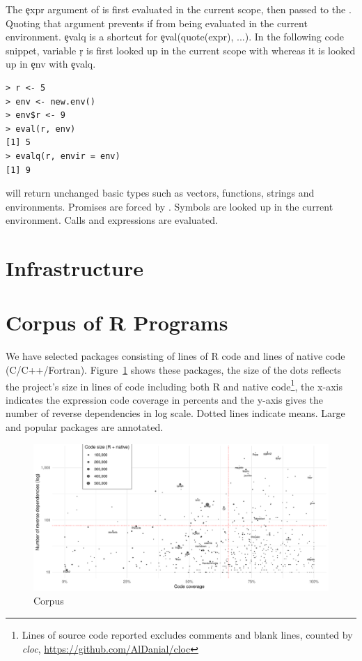 \documentclass[conference]{IEEEtran}
\begin{document}
The \c{expr} argument of \eval is first evaluated in the current scope, then passed to the \eval. Quoting that argument prevents if from being evaluated in the current environment. \c{evalq} is a shortcut for \c{eval(quote(expr), ...)}. In the following code snippet, variable \c{r} is first looked up in the current scope with \eval whereas it is looked up in \c{env} with \c{evalq}.

\begin{lstlisting}
> r <- 5
> env <- new.env()
> env$r <- 9
> eval(r, env)
[1] 5
> evalq(r, envir = env)
[1] 9
\end{lstlisting}

\eval will return unchanged basic types such as vectors, functions, strings and environments. Promises are forced by \eval. Symbols are looked up in the current environment. Calls and expressions are evaluated. 

\section{Infrastructure}


\section{Corpus of R Programs}

We have selected \CorpusPackages packages consisting of \CorpusRCodeRnd
lines of R code and \CorpusNativeCodeRnd lines of native code
(C/C++/Fortran).  Figure~\ref{fig:corpus} shows these packages, the size of
the dots reflects the project's size in lines of code including both R and
native code\footnote{Lines of source code reported excludes comments and
  blank lines, counted by \emph{cloc}, \cf
  \url{https://github.com/AlDanial/cloc}}, the x-axis indicates the
expression code coverage in percents and the y-axis gives the number of
reverse dependencies in log scale. Dotted lines indicate means. Large and
popular packages are annotated.

\begin{figure}[!tb]\centering\includegraphics[width=.9\linewidth]
  {corpus.pdf}\caption{Corpus}\label{fig:corpus}
\end{figure}
\end{document}
